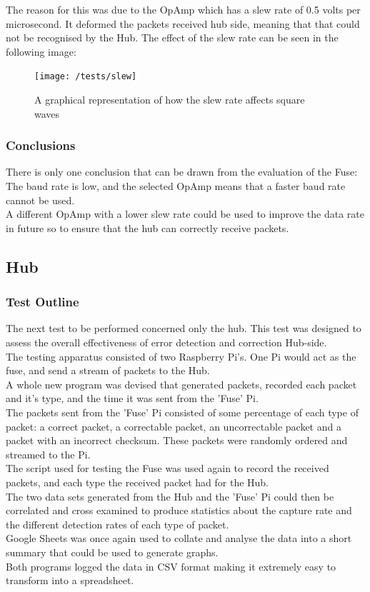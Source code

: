 \documentclass[preprint,12pt,3p]{elsarticle}
\begin{document}
The reason for this was due to the OpAmp which has a slew rate of 0.5 volts per microsecond. It deformed the packets received hub side, meaning that that could not be recognised by the Hub. The effect of the slew rate can be seen in the following image:
\begin{figure}[H]
    \centering
    \texttt{[image: /tests/slew]}
    \caption {A graphical representation of how the slew rate affects square waves~\cite{slew}}
\end{figure}

\subsubsection{Conclusions}
There is only one conclusion that can be drawn from the evaluation of the Fuse: The baud rate is low, and the selected OpAmp means that a faster baud rate cannot be used.\\
A different OpAmp with a lower slew rate could be used to improve the data rate in future so to ensure that the hub can correctly receive packets.


\subsection{Hub}
\subsubsection{Test Outline}
The next test to be performed concerned only the hub. This test was designed to assess the overall effectiveness of error detection and correction Hub-side.\\
The testing apparatus consisted of two Raspberry Pi's. One Pi would act as the fuse, and send a stream of packets to the Hub.\\ 
A whole new program was devised that generated packets, recorded each packet and it's type, and the time it was sent from the 'Fuse' Pi.\\
The packets sent from the 'Fuse' Pi consisted of some percentage of each type of packet: a correct packet, a correctable packet, an uncorrectable packet and a packet with an incorrect checksum. These packets were randomly ordered and streamed to the Pi.\\
The script used for testing the Fuse was used again to record the received packets, and each type the received packet had for the Hub.\\
The two data sets generated from the Hub and the 'Fuse' Pi could then be correlated and cross examined to produce statistics about the capture rate and the different detection rates of each type of packet.\\
Google Sheets was once again used to collate and analyse the data into a short summary that could be used to generate graphs.\\
Both programs logged the data in CSV format making it extremely easy to transform into a spreadsheet.
\end{document}
